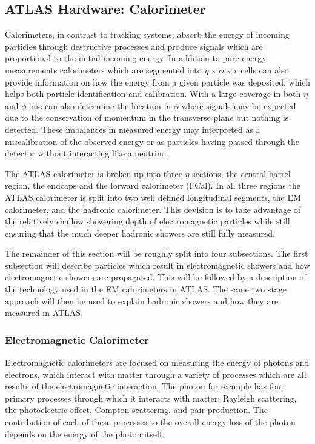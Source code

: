 \subsection{ATLAS Hardware: Calorimeter}

Calorimeters, in contrast to tracking systems, absorb the energy of incoming particles through destructive processes and produce signals which are proportional to the initial incoming energy.  
In addition to pure energy measurements calorimeters which are segmented into $\eta$ x $\phi$ x $r$ cells can also provide information on how the energy from a given particle was deposited, which helps both particle identification and calibration.  
With a large coverage in both $\eta$ and $\phi$ one can also determine the location in $\phi$ where signals may be expected due to the conservation of momentum in the transverse plane but nothing is detected.  
These imbalances in measured energy may interpreted as a miscalibration of the observed energy or as particles having passed through the detector without interacting like a neutrino.  

The ATLAS calorimeter is broken up into three $\eta$ sections, the central barrel region, the endcaps and the forward calorimeter (FCal).  
In all three regions the ATLAS calorimeter is split into two well defined longitudinal segments, the \gls{EM} calorimeter, and the hadronic calorimeter.   
This devision is to take advantage of the relatively shallow showering depth of electromagnetic particles while still ensuring that the much deeper hadronic showers are still fully measured.  

The remainder of this section will be roughly split into four subsections.  
The first subsection will describe particles which result in electromagnetic showers and how electromagnetic showers are propagated.  
This will be followed by a description of the technology used in the EM calorimeters in ATLAS.  
The same two stage approach will then be used to explain hadronic showers and how they are measured in ATLAS.  

\subsubsection{Electromagnetic Calorimeter}
\label{EMCalo} 

Electromagnetic calorimeters are focused on measuring the energy of photons and electrons, which interact with matter through a variety of processes which are all results of the electromagnetic interaction.  
The photon for example has four primary processes through which it interacts with matter: Rayleigh scattering, the photoelectric effect, Compton scattering, and pair production.  
The contribution of each of these processes to the overall energy loss of the photon depends on the energy of the photon itself.  

